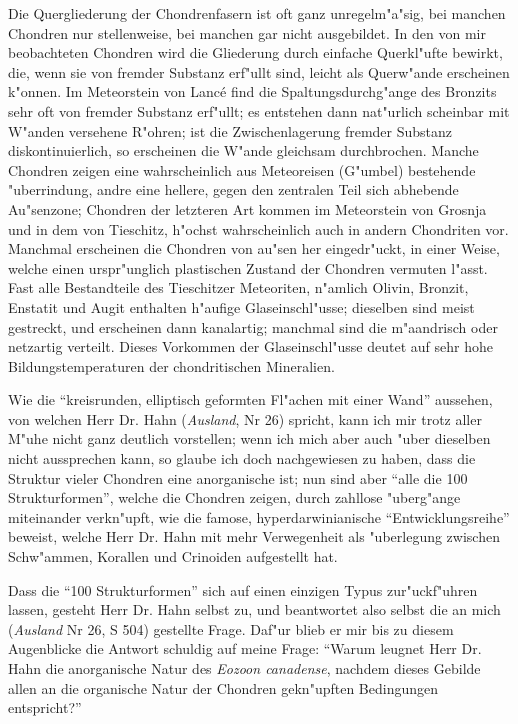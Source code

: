 \documentclass[a4paper, 12pt, oneside]{article}
\begin{document}
Die Quergliederung der Chondrenfasern ist oft ganz unregelm"a"sig, bei manchen Chondren nur stellenweise, bei manchen gar nicht ausgebildet. In den von mir beobachteten Chondren wird die Gliederung durch einfache Querkl"ufte bewirkt, die, wenn sie von fremder Substanz erf"ullt sind, leicht als Querw"ande erscheinen k"onnen. Im Meteorstein von Lancé find die Spaltungsdurchg"ange des Bronzits sehr oft von fremder Substanz erf"ullt; es entstehen dann nat"urlich scheinbar mit W"anden versehene R"ohren; ist die Zwischenlagerung fremder Substanz diskontinuierlich, so erscheinen die W"ande gleichsam durchbrochen. Manche Chondren zeigen eine wahrscheinlich aus Meteoreisen (G"umbel) bestehende "uberrindung, andre eine hellere, gegen den zentralen Teil sich abhebende Au"senzone; Chondren der letzteren Art kommen im Meteorstein von Grosnja und in dem von Tieschitz, h"ochst wahrscheinlich auch in andern Chondriten vor. Manchmal erscheinen die Chondren von au"sen her eingedr"uckt, in einer Weise, welche einen urspr"unglich plastischen Zustand der Chondren vermuten l"asst. Fast alle Bestandteile des Tieschitzer Meteoriten, n"amlich Olivin, Bronzit, Enstatit und Augit enthalten h"aufige Glaseinschl"usse; dieselben sind meist gestreckt, und erscheinen dann kanalartig; manchmal sind die m"aandrisch oder netzartig verteilt. Dieses Vorkommen der Glaseinschl"usse deutet auf sehr hohe Bildungstemperaturen der chondritischen Mineralien.

Wie die "`kreisrunden, elliptisch geformten Fl"achen mit einer Wand"' aussehen, von welchen Herr Dr. Hahn (\emph{Ausland}, Nr 26) spricht, kann ich mir trotz aller M"uhe nicht ganz deutlich vorstellen; wenn ich mich aber auch "uber dieselben nicht aussprechen kann, so glaube ich doch nachgewiesen zu haben, dass die Struktur vieler Chondren eine anorganische ist; nun sind aber "`alle die 100 Strukturformen"', welche die Chondren zeigen, durch zahllose "uberg"ange miteinander verkn"upft, wie die famose, hyperdarwinianische "`Entwicklungsreihe"' beweist, welche Herr Dr. Hahn mit mehr Verwegenheit als "uberlegung zwischen Schw"ammen, Korallen und Crinoiden aufgestellt hat.

Dass die "`100 Strukturformen"' sich auf einen einzigen Typus zur"uckf"uhren lassen, gesteht Herr Dr. Hahn selbst zu, und beantwortet also selbst die an mich (\emph{Ausland} Nr 26, S 504) gestellte Frage. Daf"ur blieb er mir bis zu diesem Augenblicke die Antwort schuldig auf meine Frage: "`Warum leugnet Herr Dr. Hahn die anorganische Natur des \emph{Eozoon canadense}, nachdem dieses Gebilde allen an die organische Natur der Chondren gekn"upften Bedingungen entspricht?"'
\end{document}
